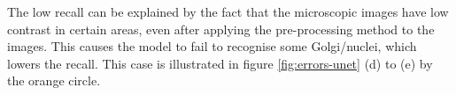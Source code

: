 The low recall can be explained by the fact that the microscopic images have low contrast in certain areas, even after applying the pre-processing method to the images. This causes the model to fail to recognise some Golgi/nuclei, which lowers the recall. This case is illustrated in figure \ref{fig:errors-unet} (d) to (e) by the orange circle.

\begin{figure}[!htb]

\centering
{}\hfil
{}\hfil 
{} 


\end{figure}
